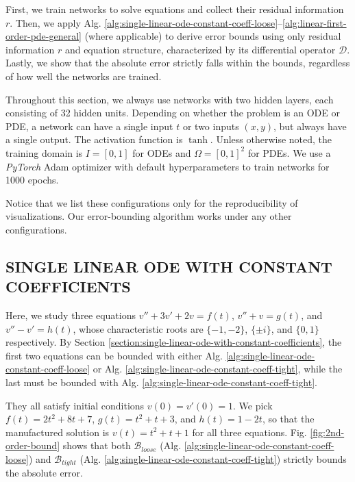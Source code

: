 \documentclass{uai2023}
\newcommand{\Bound}{\mathcal{B}}
\begin{document}
    First, we train networks to solve equations and collect their residual information $r$.
    Then, we apply Alg. \ref{alg:single-linear-ode-constant-coeff-loose}--\ref{alg:linear-first-order-pde-general} (where applicable) to derive error bounds using only residual information $r$ and equation structure, characterized by its differential operator $\mathcal {D}$. 
    Lastly, we show that the absolute error strictly falls within the bounds, regardless of how well the networks are trained.

    Throughout this section, we always use networks with two hidden layers, each consisting of 32 hidden units.
    Depending on whether the problem is an ODE or PDE, a network can have a single input $t$ or two inputs $(x, y)$, but always have a single output.
    The activation function is $\tanh$. 
    Unless otherwise noted, the training domain is $I=[0, 1]$ for ODEs and $\Omega=[0,1]^2$ for PDEs. 
    We use a \textit{PyTorch} Adam optimizer with default hyperparameters to train networks for 1000 epochs.

    Notice that we list these configurations only for the reproducibility of visualizations. 
    Our error-bounding algorithm works under any other configurations.

\subsection{SINGLE LINEAR ODE WITH CONSTANT COEFFICIENTS}
    Here, we study three equations $v'' + 3v' + 2v = f(t)$, $v'' + v = g(t)$, and $v'' - v' = h(t)$, whose characteristic roots are $\{-1, -2\}$, $\{\pm i\}$, and $\{0, 1\}$ respectively. 
    By Section \ref{section:single-linear-ode-with-constant-coefficients}, the first two equations can be bounded with either Alg. \ref{alg:single-linear-ode-constant-coeff-loose} or Alg. \ref{alg:single-linear-ode-constant-coeff-tight}, while the last must be bounded with Alg. \ref{alg:single-linear-ode-constant-coeff-tight}.

    They all satisfy initial conditions $v(0) = v'(0) = 1$. 
    We pick $f(t) =2t^2+8t+7$, $g(t) = t^2+t+3$, and $h(t)=1-2t$, so that the manufactured solution is $v(t) = t^2 + t + 1$ for all three equations.
    Fig. \ref{fig:2nd-order-bound} shows that both $\Bound_{loose}$ (Alg. \ref{alg:single-linear-ode-constant-coeff-loose}) and $\Bound_{tight}$ (Alg. \ref{alg:single-linear-ode-constant-coeff-tight}) strictly bounds the absolute error.
    
\end{document}
